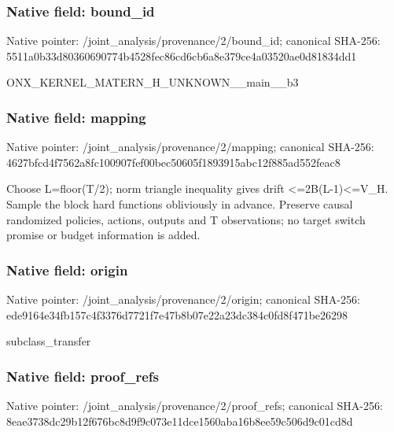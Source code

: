 \documentclass[10pt,a4paper]{article}
\begin{document}
\subsubsection{Native field: bound\_\allowbreak{}id}
Native pointer: /joint\_\allowbreak{}analysis/provenance/2/bound\_\allowbreak{}id; canonical SHA-256: 5511a0b33d80360690774b4528fec86cd6cb6a8e379ce4a03520ae0d81834dd1

\begingroup\raggedright\sloppy ONX\_\allowbreak{}KERNEL\_\allowbreak{}MATERN\_\allowbreak{}H\_\allowbreak{}UNKNOWN\_\allowbreak{}\_\allowbreak{}main\_\allowbreak{}\_\allowbreak{}b3\par\endgroup

\subsubsection{Native field: mapping}
Native pointer: /joint\_\allowbreak{}analysis/provenance/2/mapping; canonical SHA-256: 4627bfcd4f7562a8fc100907fef00bec50605f1893915abc12f885ad552feac8

\begingroup\raggedright\sloppy Choose L=\allowbreak{}floor(T/\allowbreak{}2);\allowbreak{} norm triangle inequality gives drift <=\allowbreak{}2B(L-1)<=\allowbreak{}V\_\allowbreak{}H. Sample the block hard functions obliviously in advance. Preserve causal randomized policies,\allowbreak{} actions,\allowbreak{} outputs and T observations;\allowbreak{} no target switch promise or budget information is added.\par\endgroup

\subsubsection{Native field: origin}
Native pointer: /joint\_\allowbreak{}analysis/provenance/2/origin; canonical SHA-256: ede9164e34fb157c4f3376d7721f7e47b8b07e22a23dc384c0fd8f471be26298

\begingroup\raggedright\sloppy subclass\_\allowbreak{}transfer\par\endgroup

\subsubsection{Native field: proof\_\allowbreak{}refs}
Native pointer: /joint\_\allowbreak{}analysis/provenance/2/proof\_\allowbreak{}refs; canonical SHA-256: 8eae3738dc29b12f676bc8d9f9c073e11dce1560aba16b8ee59c506d9c01cd8d
\end{document}
